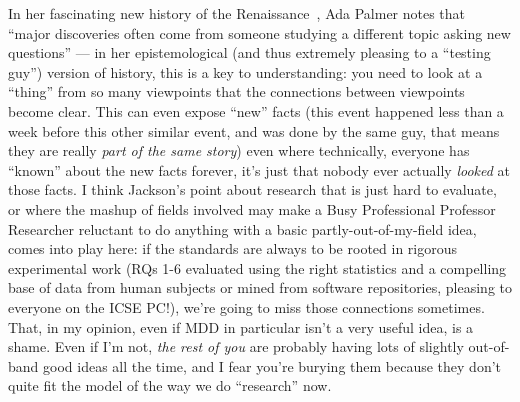 \documentclass[sigplan,screen]{acmart}
\begin{document}
In her fascinating new history of the Renaissance~\cite{palmer}, Ada
Palmer notes that ``major discoveries often come from someone studying
a different topic asking new questions'' --- in her epistemological
(and thus extremely pleasing to a ``testing guy'') version of history,
this is a key to understanding:  you need to look at a ``thing'' from so many
viewpoints that the connections between viewpoints become clear.  This
can even expose ``new''
facts (this event happened less than a week before
this other similar event, and was done by the same guy, that means
they are really \emph{part of the same story}) even where technically,
everyone has ``known'' about the new facts forever, it's just that
nobody ever actually \emph{looked} at those facts.  I think Jackson's
point about research that is just hard to evaluate, or where the mashup of fields
involved may make a Busy Professional Professor Researcher reluctant
to do anything with a basic partly-out-of-my-field idea, comes into play here:  if the standards are
always to be rooted in rigorous experimental work (RQs 1-6 evaluated
using the right statistics and a compelling base of data from human
subjects or mined from software repositories, pleasing to everyone on
the ICSE PC!), we're going to miss those connections sometimes.
That, in my opinion, even if MDD in particular isn't a very useful
idea, is a shame.  Even if I'm not, \emph{the rest of you} are probably having lots of
slightly out-of-band good ideas all the time, and I fear you're
burying them because they don't quite fit the model of the way we do
``research'' now.



\end{document}
